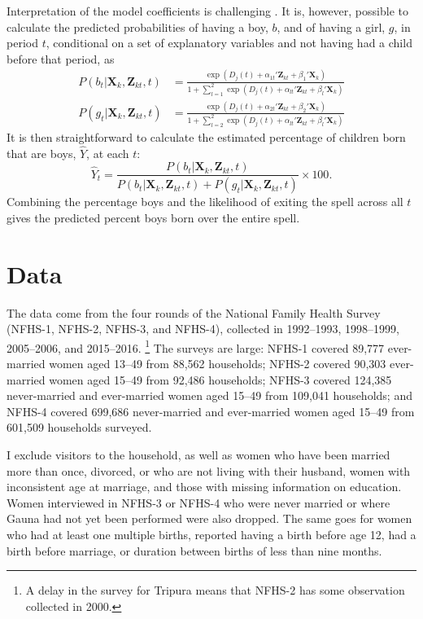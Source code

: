 \documentclass[12pt,letterpaper]{article}
\begin{document}
Interpretation of the model coefficients is challenging \citep{thomas96}.
It is, however, possible to calculate the predicted probabilities of 
having a boy, $b$, and of having a girl, $g$, in period $t$, conditional on 
a set of explanatory variables and not having had a child before that period, as
\begin{align}
P(b_{t} | \mathbf{X}_{k}, \mathbf{Z}_{kt}, t ) 
& =  
\frac{ \exp(D_j(t) + \alpha_{1t}' \mathbf{Z}_{kt} + \beta_1' \mathbf{X}_{k} )}
{1 + \sum_{l=1}^2 \exp(D_j(t) + \alpha_{lt} ' \mathbf{Z}_{kt} + \beta_l ' \mathbf{X}_{k})}
\label{eq:probability_boy} \\
P(g_{t} | \mathbf{X}_{k}, \mathbf{Z}_{kt},t ) 
& =  
\frac{ \exp(D_j(t) + \alpha_{2t}'\mathbf{Z}_{kt} + \beta_2'\mathbf{X}_{k} )}
{1 + \sum_{l=2}^2 \exp(D_j(t) + \alpha_{lt}'\mathbf{Z}_{kt} + \beta_l'\mathbf{X}_{k})}
\label{eq:probability_girl}
\end{align}
It is then straightforward to calculate the estimated percentage of children born that 
are boys, $\hat{Y}$, at each $t$:  
\begin{equation}
\hat{Y}_t 
= 
\frac{ P(b_{t} | \mathbf{X}_{k}, \mathbf{Z}_{kt},t )}
{ P(b_{t} | \mathbf{X}_{k}, \mathbf{Z}_{kt},t) + P(g_{t} | \mathbf{X}_{k}, \mathbf{Z}_{kt},t )} 
\times 100.
\label{eq:probability_son}
\end{equation}
Combining the percentage boys and the likelihood of exiting the spell 
across all $t$ gives the predicted percent boys born over the entire spell.


\section{Data\label{sec:data}}

The data come from the four rounds of the National Family Health Survey 
(NFHS-1, NFHS-2, NFHS-3, and NFHS-4),
collected in 1992--1993, 1998--1999, 2005--2006, and 2015--2016.%
\footnote{
A delay in the survey for Tripura means that NFHS-2 has some observation 
collected in 2000.
}
The surveys are large: NFHS-1 covered 89,777 ever-married women 
aged 13--49 from 88,562 households;
NFHS-2 covered 90,303 ever-married women aged 15--49 from 92,486 households;
NFHS-3 covered 124,385 never-married and ever-married women aged 
15--49 from 109,041 households;
and 
NFHS-4 covered 699,686 never-married and ever-married women aged
15--49 from 601,509 households surveyed.

I exclude visitors to the household, as well as
women who have been married more than once, divorced, or who are 
not living with their husband,
women with inconsistent age at marriage,
and those with missing information on education.
Women interviewed in NFHS-3 or NFHS-4 who were never married or where Gauna 
had not yet been performed were also dropped.
The same goes for women who had at least one multiple births,
reported having a birth before age 12, had a birth before marriage, or
duration between births of less than nine months.
\end{document}
